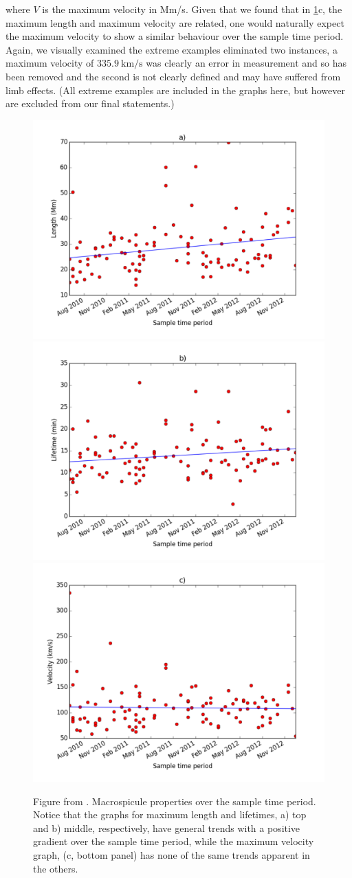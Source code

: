 \noindent where $V$ is the maximum velocity in Mm/s. Given that we found that in \cref{fig:sol-cyc-rels}c, the maximum length and maximum velocity are related, one would naturally expect the maximum velocity to show a similar behaviour over the sample time period. Again, we visually examined the extreme examples eliminated two instances, a maximum velocity of $335.9\ \textrm{km/s}$ was clearly an error in measurement and so has been removed and the second is not clearly defined and may have suffered from limb effects. (All extreme examples are included in the graphs here, but however are excluded from our final statements.)

\begin{figure}[h]
	\centering
	\includegraphics[width=0.4\columnwidth]{Chapter3/Figs/length_vs_solarcycle.pdf}
	\includegraphics[width=0.4\columnwidth]{Chapter3/Figs/life_vs_solarcycle.pdf}
	\includegraphics[width=0.4\columnwidth]{Chapter3/Figs/velocity_vs_solarcycle.pdf}
	\caption{\small Figure from \cite{Bennett2015}. Macrospicule properties over the sample time period. Notice that the graphs for maximum length and lifetimes, a) top and b) middle, respectively, have general trends with a positive gradient over the sample time period, while the maximum velocity graph, (c, bottom panel) has none of the same trends apparent in the others.}
	\label{fig:sol-cyc-rels}
\end{figure}


